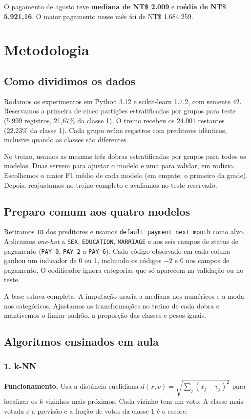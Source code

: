 \documentclass[11pt,a4paper]{article}
\newcommand{\status}[1]{\texttt{PAY\_#1}}
\begin{document}
O pagamento de agosto teve \textbf{mediana de NT\$ 2.009} e \textbf{média de
NT\$ 5.921,16}. O maior pagamento nesse mês foi de NT\$ 1.684.259.

\newpage
\section{Metodologia}
\subsection*{Como dividimos os dados}
Rodamos os experimentos em Python 3.12 e scikit-learn 1.7.2, com semente
42. Reservamos a primeira de cinco partições estratificadas por grupos
para teste (5.999 registros, 21,67\% da classe 1). O treino recebeu os
24.001 restantes (22,23\% da classe 1). Cada grupo reúne registros com
preditores idênticos, inclusive quando as classes são diferentes.

No treino, usamos as mesmas três dobras estratificadas por grupos para
todos os modelos. Duas servem para ajustar o modelo e uma para validar,
em rodízio. Escolhemos o maior F1 médio de cada modelo (em empate, o
primeiro da grade). Depois, reajustamos no treino completo e avaliamos no teste reservado.

\subsection*{Preparo comum aos quatro modelos}
Retiramos \texttt{ID} dos preditores e usamos \texttt{default payment next
month} como alvo. Aplicamos \textit{one-hot} a \texttt{SEX},
\texttt{EDUCATION}, \texttt{MARRIAGE} e aos seis campos de status de
pagamento (\status{0}, \status{2} a \status{6}). Cada código observado
em cada coluna ganhou um indicador de 0 ou 1, incluindo os códigos
$-2$ e 0 nos campos de pagamento. O codificador ignora categorias que
só aparecem na validação ou no teste.

A base estava completa. A imputação usaria a mediana nos numéricos e a
moda nos categóricos. Ajustamos as transformações no treino de cada
dobra e mantivemos o limiar padrão, a proporção das classes e pesos iguais.

\subsection*{Algoritmos ensinados em aula}

\subsubsection*{1. k-NN}
\textbf{Funcionamento.} Usa a distância euclidiana
$d(x,v)=\sqrt{\sum_j(x_j-v_j)^2}$ para localizar os $k$ vizinhos mais
próximos. Cada vizinho tem um voto. A classe mais votada é a previsão
e a fração de votos da classe 1 é o escore.
\end{document}
